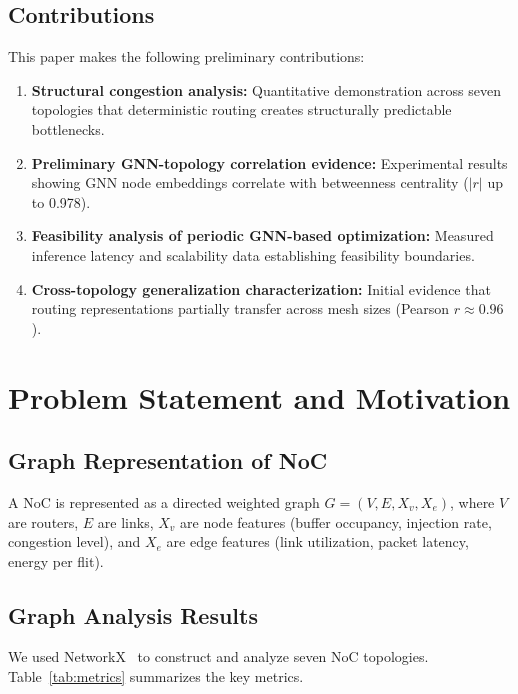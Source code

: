 \documentclass[conference]{IEEEtran}
\begin{document}
\subsection{Contributions}
\label{sec:contributions}

This paper makes the following preliminary contributions:
\begin{enumerate}
    \item \textbf{Structural congestion analysis:} Quantitative demonstration across seven topologies that deterministic routing creates structurally predictable bottlenecks.
    \item \textbf{Preliminary GNN-topology correlation evidence:} Experimental results showing GNN node embeddings correlate with betweenness centrality ($|r|$ up to 0.978).
    \item \textbf{Feasibility analysis of periodic GNN-based optimization:} Measured inference latency and scalability data establishing feasibility boundaries.
    \item \textbf{Cross-topology generalization characterization:} Initial evidence that routing representations partially transfer across mesh sizes (Pearson $r \approx 0.96$).
\end{enumerate}

\section{Problem Statement and Motivation}
\label{sec:problem}

\subsection{Graph Representation of NoC}

A NoC is represented as a directed weighted graph $G=(V,E,X_v,X_e)$, where $V$ are routers, $E$ are links, $X_v$ are node features (buffer occupancy, injection rate, congestion level), and $X_e$ are edge features (link utilization, packet latency, energy per flit).

\subsection{Graph Analysis Results}

We used NetworkX~\cite{networkx2008} to construct and analyze seven NoC topologies. Table~\ref{tab:metrics} summarizes the key metrics.
\end{document}
